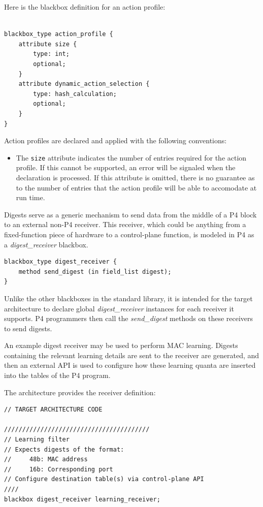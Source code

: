 \documentclass[12pt]{article}
\begin{document}
Here is the blackbox definition for an action profile:

\begin{lstlisting}[style=P4style]

blackbox_type action_profile {
    attribute size {
        type: int;
        optional;
    }
    attribute dynamic_action_selection {
        type: hash_calculation;
        optional;
    }
}

\end{lstlisting}

Action profiles are declared and applied with the following conventions:

\begin{itemize}
\item
The \texttt{size} attribute indicates the number of entries required for the
action profile. If this cannot be supported, an error will be signaled when the
declaration is processed. If this attribute is omitted, there is no guarantee as
to the number of entries that the action profile will be able to accomodate at
run time.
\end{itemize}


Digests serve as a generic mechanism to send data from the middle of a P4 block
to an external non-P4 receiver. This receiver, which could be anything from a
fixed-function piece of hardware to a control-plane function, is modeled in P4
as a \textit{digest_receiver} blackbox.

\begin{lstlisting}[style=P4style]
blackbox_type digest_receiver {
    method send_digest (in field_list digest);
}
\end{lstlisting}

Unlike the other blackboxes in the standard library, it is intended for the
target architecture to declare global \textit{digest_receiver} instances for
each receiver it supports. P4 programmers then call the \textit{send_digest}
methods on these receivers to send digests.

An example digest receiver may be used to perform MAC learning. Digests
containing the relevant learning details are sent to the receiver are
generated, and then an external API is used to configure how these learning
quanta are inserted into the tables of the P4 program.

The architecture provides the receiver definition:
\begin{lstlisting}[style=P4style]
// TARGET ARCHITECTURE CODE

////////////////////////////////////////
// Learning filter
// Expects digests of the format:
//     48b: MAC address
//     16b: Corresponding port
// Configure destination table(s) via control-plane API
////
blackbox digest_receiver learning_receiver;
\end{lstlisting}
\end{document}
